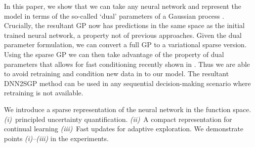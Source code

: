 \documentclass{article}
\begin{document}
In this paper, we show that we can take any neural network and represent the model in terms of the so-called `dual' parameters of a Gaussian process \cite{csato2002sparse, adam2021dual, chang2020fast}. Crucially, the resultant GP now has predictions in the same space as the initial trained neural network, a property not of previous approaches. Given the dual parameter formulation, we can convert a full GP to a variational sparse version. Using the sparse GP we can then take advantage of the property of dual parameters that allows for fast conditioning recently shown in \cite{chang2022fantasizing}. Thus we are able to avoid retraining and condition new data in to our model. The resultant DNN2SGP method can be used in any sequential decision-making scenario where retraining is not available.%




We introduce a sparse representation of the neural network in the function space. 
%
{\em (i)}~principled uncertainty quantification.
{\em (ii)}~A compact representation for continual learning
{\em (iii)}~Fast updates for adaptive exploration.
%
We demonstrate points {\em(i)--(iii)} in the experiments.

\end{document}
